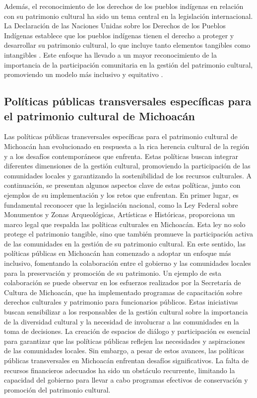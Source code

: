 \documentclass[
  spanish,
  11pt,
  a4paper,
]{scrbook}
\begin{document}
Además, el reconocimiento de los derechos de los pueblos indígenas en
relación con su patrimonio cultural ha sido un tema central en la
legislación internacional. La Declaración de las Naciones Unidas sobre
los Derechos de los Pueblos Indígenas establece que los pueblos
indígenas tienen el derecho a proteger y desarrollar su patrimonio
cultural, lo que incluye tanto elementos tangibles como intangibles
\autocite{Sikora2021}. Este enfoque ha llevado a un mayor reconocimiento
de la importancia de la participación comunitaria en la gestión del
patrimonio cultural, promoviendo un modelo más inclusivo y equitativo
\autocite{Sikora2021}.

\subsection*{Políticas públicas transversales específicas para el
patrimonio cultural de
Michoacán}\label{poluxedticas-puxfablicas-transversales-especuxedficas-para-el-patrimonio-cultural-de-michoacuxe1n}

Las políticas públicas transversales específicas para el patrimonio
cultural de Michoacán han evolucionado en respuesta a la rica herencia
cultural de la región y a los desafíos contemporáneos que enfrenta.
Estas políticas buscan integrar diferentes dimensiones de la gestión
cultural, promoviendo la participación de las comunidades locales y
garantizando la sostenibilidad de los recursos culturales. A
continuación, se presentan algunos aspectos clave de estas políticas,
junto con ejemplos de su implementación y los retos que enfrentan. En
primer lugar, es fundamental reconocer que la legislación nacional, como
la Ley Federal sobre Monumentos y Zonas Arqueológicas, Artísticas e
Históricas, proporciona un marco legal que respalda las políticas
culturales en Michoacán. Esta ley no solo protege el patrimonio
tangible, sino que también promueve la participación activa de las
comunidades en la gestión de su patrimonio cultural. En este sentido,
las políticas públicas en Michoacán han comenzado a adoptar un enfoque
más inclusivo, fomentando la colaboración entre el gobierno y las
comunidades locales para la preservación y promoción de su patrimonio.
Un ejemplo de esta colaboración se puede observar en los esfuerzos
realizados por la Secretaría de Cultura de Michoacán, que ha
implementado programas de capacitación sobre derechos culturales y
patrimonio para funcionarios públicos. Estas iniciativas buscan
sensibilizar a los responsables de la gestión cultural sobre la
importancia de la diversidad cultural y la necesidad de involucrar a las
comunidades en la toma de decisiones. La creación de espacios de diálogo
y participación es esencial para garantizar que las políticas públicas
reflejen las necesidades y aspiraciones de las comunidades locales. Sin
embargo, a pesar de estos avances, las políticas públicas transversales
en Michoacán enfrentan desafíos significativos. La falta de recursos
financieros adecuados ha sido un obstáculo recurrente, limitando la
capacidad del gobierno para llevar a cabo programas efectivos de
conservación y promoción del patrimonio cultural.
\end{document}
